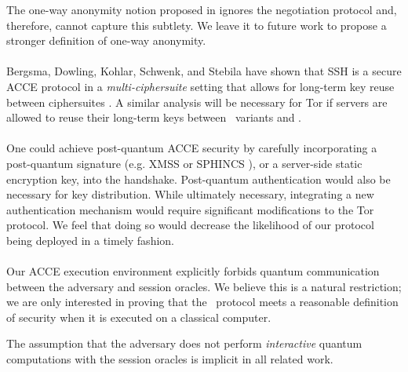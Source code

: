 \documentclass[USenglish,oneside,twocolumn]{article}
\theoremstyle{dgthm}
\theoremstyle{dgdef}
\newcommand{\ntor}{{\sf {ntor}}}
\newcommand{\hybrid}{{\sf {hybrid}}}
\begin{document}
    The one-way anonymity notion proposed in \cite{GoldbergSU13} ignores the
    negotiation protocol and, therefore, cannot capture this subtlety. We leave
    it to future work to propose a stronger definition of one-way anonymity.\\

    \\
    Bergsma, Dowling, Kohlar, Schwenk, and Stebila have shown that SSH is a
    secure ACCE protocol in a \emph{multi-ciphersuite} setting that allows for
    long-term key reuse between ciphersuites \cite{Bergsma2014}. A similar
    analysis will be necessary for Tor if servers are allowed to reuse their
    long-term keys between \hybrid~variants and \ntor.\\

    \\
    One could achieve post-quantum ACCE security by carefully incorporating a
    post-quantum signature (e.g. XMSS \cite{Buchmann2011} or SPHINCS
    \cite{Bernstein2015}), or a server-side static encryption key, into the
    handshake. Post-quantum authentication would also be necessary for key
    distribution. While ultimately necessary, integrating a new authentication
    mechanism would require significant modifications to the Tor protocol.  We
    feel that doing so would decrease the likelihood of our protocol being
    deployed in a timely fashion.\\

    \\
    Our ACCE execution environment explicitly forbids quantum communication
    between the adversary and session oracles. We believe this is a natural
    restriction; we are only interested in proving that the \hybrid~protocol
    meets a reasonable definition of security when it is executed on a
    classical computer.

    The assumption that the adversary does not perform \emph{interactive}
    quantum computations with the session oracles is implicit in all related
    work. \\



\end{document}
